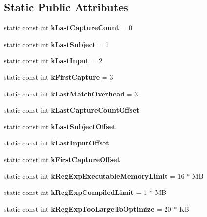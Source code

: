 \subsection*{Static Public Attributes}
\begin{DoxyCompactItemize}
\item 
static const int {\bfseries k\+Last\+Capture\+Count} = 0\hypertarget{classv8_1_1internal_1_1_reg_exp_impl_a0ebdcb279e7c56f30c397ba84dd25833}{}\label{classv8_1_1internal_1_1_reg_exp_impl_a0ebdcb279e7c56f30c397ba84dd25833}

\item 
static const int {\bfseries k\+Last\+Subject} = 1\hypertarget{classv8_1_1internal_1_1_reg_exp_impl_af0bb70863d5995ff8b58fdae9fbcf7fe}{}\label{classv8_1_1internal_1_1_reg_exp_impl_af0bb70863d5995ff8b58fdae9fbcf7fe}

\item 
static const int {\bfseries k\+Last\+Input} = 2\hypertarget{classv8_1_1internal_1_1_reg_exp_impl_a938ab5e472e920331c8be2ba9096bf0d}{}\label{classv8_1_1internal_1_1_reg_exp_impl_a938ab5e472e920331c8be2ba9096bf0d}

\item 
static const int {\bfseries k\+First\+Capture} = 3\hypertarget{classv8_1_1internal_1_1_reg_exp_impl_aef40942dc86416fc05927c875c5339dd}{}\label{classv8_1_1internal_1_1_reg_exp_impl_aef40942dc86416fc05927c875c5339dd}

\item 
static const int {\bfseries k\+Last\+Match\+Overhead} = 3\hypertarget{classv8_1_1internal_1_1_reg_exp_impl_a4fe094990a563f4b6cf3e54eaaa11302}{}\label{classv8_1_1internal_1_1_reg_exp_impl_a4fe094990a563f4b6cf3e54eaaa11302}

\item 
static const int {\bfseries k\+Last\+Capture\+Count\+Offset}
\item 
static const int {\bfseries k\+Last\+Subject\+Offset}
\item 
static const int {\bfseries k\+Last\+Input\+Offset}
\item 
static const int {\bfseries k\+First\+Capture\+Offset}
\item 
static const int {\bfseries k\+Reg\+Exp\+Executable\+Memory\+Limit} = 16 $\ast$ MB\hypertarget{classv8_1_1internal_1_1_reg_exp_impl_a8a35e37765c28a6f65ad7deed00e45bf}{}\label{classv8_1_1internal_1_1_reg_exp_impl_a8a35e37765c28a6f65ad7deed00e45bf}

\item 
static const int {\bfseries k\+Reg\+Exp\+Compiled\+Limit} = 1 $\ast$ MB\hypertarget{classv8_1_1internal_1_1_reg_exp_impl_adab654cc82ba90893461291da50e84af}{}\label{classv8_1_1internal_1_1_reg_exp_impl_adab654cc82ba90893461291da50e84af}

\item 
static const int {\bfseries k\+Reg\+Exp\+Too\+Large\+To\+Optimize} = 20 $\ast$ KB\hypertarget{classv8_1_1internal_1_1_reg_exp_impl_af0ef2050306fce6dc564448ac4bd5124}{}\label{classv8_1_1internal_1_1_reg_exp_impl_af0ef2050306fce6dc564448ac4bd5124}

\end{DoxyCompactItemize}
